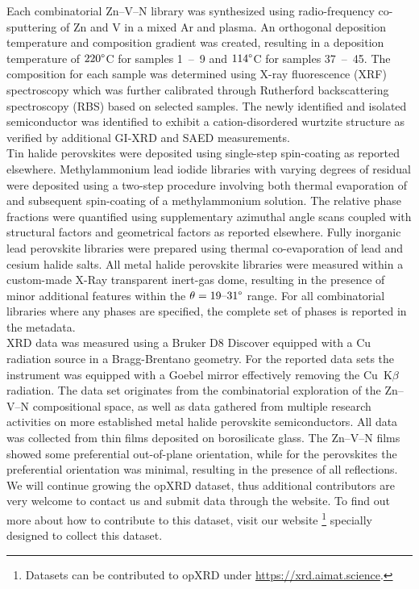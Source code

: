 Each combinatorial Zn–V–N library was synthesized using radio-frequency co-sputtering of Zn and V in a mixed Ar and  plasma. An orthogonal deposition temperature and composition gradient was created, resulting in a deposition temperature of $220\degree$C for samples 1~–~9 and $114\degree$C for samples 37~–~45. The composition for each sample was determined using X-ray fluorescence (XRF) spectroscopy which was further calibrated through Rutherford backscattering spectroscopy (RBS) based on selected samples. The newly identified and isolated semiconductor  was identified to exhibit a cation-disordered wurtzite structure as verified by additional GI-XRD and SAED measurements\cite{Zhuk2021}. \\
Tin halide perovskites were deposited using single-step spin-coating as reported elsewhere\cite{Wieczorek2023}. Methylammonium lead iodide libraries with varying degrees of residual  were deposited using a two-step procedure involving both thermal evaporation of  and subsequent spin-coating of a methylammonium solution. The relative phase fractions were quantified using supplementary azimuthal angle scans coupled with structural factors and geometrical factors as reported elsewhere\cite{Wieczorek2024}. Fully inorganic lead perovskite libraries were prepared using thermal co-evaporation of lead and cesium halide salts.
All metal halide perovskite libraries were measured within a custom-made X-Ray transparent inert-gas dome, resulting in the presence of minor additional features within the $\theta=19 \text{–}31\degree$ range. For all combinatorial libraries where any phases are specified, the complete set of phases is reported in the metadata. \\

XRD data was measured using a Bruker D8 Discover equipped with a Cu radiation source in a Bragg-Brentano geometry. For the reported data sets the instrument was equipped with a Goebel mirror effectively removing the Cu~K$\beta$ radiation. The data set originates from the combinatorial exploration of the Zn–V–N compositional space, as well as data gathered from multiple research activities on more established metal halide perovskite semiconductors. All data was collected from thin films deposited on borosilicate glass. The Zn–V–N films showed some preferential out-of-plane orientation, while for the perovskites the preferential orientation was minimal, resulting in the presence of all reflections. \\


We will continue growing the opXRD dataset, thus additional contributors are very welcome to contact us and submit data through the website. To find out more about how to contribute to this dataset, visit our website \footnote{Datasets can be contributed to opXRD under \url{https://xrd.aimat.science}.} specially designed to collect this dataset.